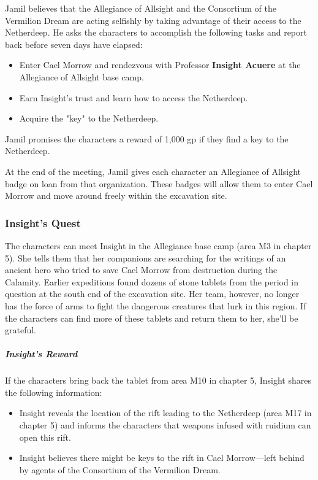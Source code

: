 \documentclass[10pt,a4paper,twoside,fancy,bg=print,twocolumn,openany,nodeprecatedcode]{dndbook}
\begin{document}
Jamil believes that the Allegiance of Allsight and the Consortium of the Vermilion Dream are acting selfishly by taking advantage of their access to the Netherdeep. He asks the characters to accomplish the following tasks and report back before seven days have elapsed:


\begin{itemize}
\item Enter Cael Morrow and rendezvous with Professor \textbf{Insight Acuere} at the Allegiance of Allsight base camp.
\item Earn Insight's trust and learn how to access the Netherdeep.
\item Acquire the "key" to the Netherdeep.
\end{itemize}

Jamil promises the characters a reward of 1,000 gp if they find a key to the Netherdeep.

At the end of the meeting, Jamil gives each character an Allegiance of Allsight badge on loan from that organization. These badges will allow them to enter Cael Morrow and move around freely within the excavation site.

\subsubsection{Insight's Quest}
The characters can meet Insight in the Allegiance base camp (area M3 in chapter 5). She tells them that her companions are searching for the writings of an ancient hero who tried to save Cael Morrow from destruction during the Calamity. Earlier expeditions found dozens of stone tablets from the period in question at the south end of the excavation site. Her team, however, no longer has the force of arms to fight the dangerous creatures that lurk in this region. If the characters can find more of these tablets and return them to her, she'll be grateful.

\subparagraph{Insight's Reward}
If the characters bring back the tablet from area M10 in chapter 5, Insight shares the following information:


\begin{itemize}
\item Insight reveals the location of the rift leading to the Netherdeep (area M17 in chapter 5) and informs the characters that weapons infused with ruidium can open this rift.
\item Insight believes there might be keys to the rift in Cael Morrow—left behind by agents of the Consortium of the Vermilion Dream.
\end{itemize}
\end{document}
